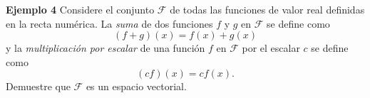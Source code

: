 \begin{frame}%


\vspace{-2mm}
\begin{ej}{\textbf{Ejemplo 4}}\justifying
	Considere el conjunto $\mathcal{F}$ de todas las funciones de valor real definidas en la recta numérica.
	La \textit{suma} de dos funciones $f$ y $g$ en $\mathcal{F}$ se define como
	\[
		(f+g)(x) = f(x) + g(x)
	\]
	y la \textit{multiplicación por escalar} de una función $f$ en $\mathcal{F}$ por el escalar $c$ se define como
	\[
		(cf)(x) = cf(x).
	\]
	Demuestre que $\mathcal{F}$ es un espacio vectorial.
\end{ej}

\vspace{-1mm}


\end{frame}
